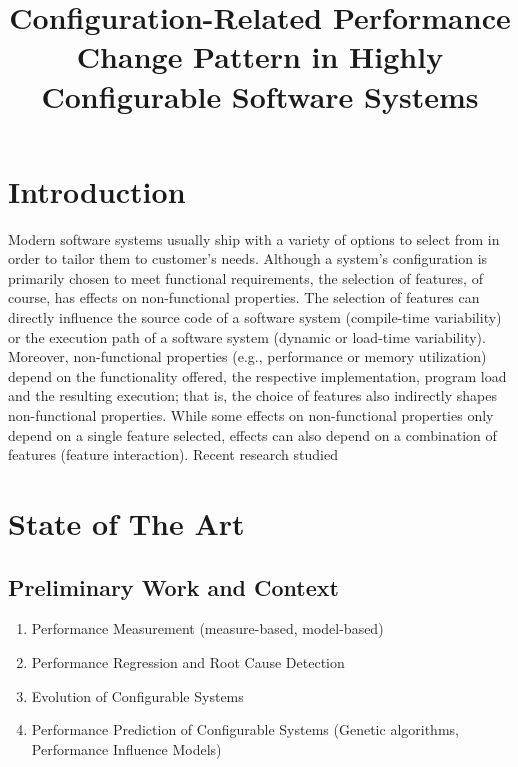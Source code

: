\documentclass[a4paper,10pt]{scrartcl}
\title{Configuration-Related Performance Change Pattern in Highly Configurable
Software Systems}
\date{}
\begin{document}


\section{Introduction}
Modern software systems usually ship with a variety of options to select from
in order to tailor them to customer’s needs. Although a system’s configuration
is primarily chosen to meet functional requirements, the selection of features,
of course, has effects on non-functional properties. The selection of features
can directly influence the source code of a software system (compile-time
variability) or the execution path of a software system (dynamic or load-time
variability). Moreover, non-functional properties (e.g., performance or memory
utilization) depend on the functionality offered, the respective
implementation, program load and the resulting execution; that is, the choice of
features also indirectly shapes non-functional properties. While some effects
on non-functional properties only depend on a single feature selected, effects
can also depend on a combination of features (feature interaction).
Recent research studied 

\section{State of The Art}

\subsection{Preliminary Work and Context}
\begin{enumerate}
  \item Performance Measurement (measure-based, model-based)
  \item Performance Regression and Root Cause Detection
  \item Evolution of Configurable Systems
  \item Performance Prediction of Configurable Systems (Genetic algorithms,
  Performance Influence Models)
\end{enumerate}
\end{document}
